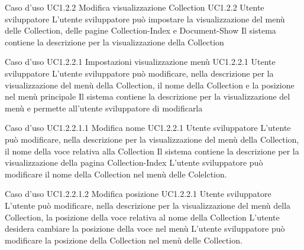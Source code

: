 \UCtitle
{Caso d'uso UC1.2.2}
{Modifica visualizzazione Collection}
\UC
{UC1.2.2}
{Utente sviluppatore}
{L'utente sviluppatore  può impostare la visualizzazione del menù delle Collection, delle pagine Collection-Index e Document-Show}
{Il sistema contiene la descrizione per la visualizzazione della Collection}

\UCtitle
{Caso d'uso UC1.2.2.1}
{Impostazioni visualizzazione menù}
\UC
{UC1.2.2.1}
{Utente sviluppatore}
{L'utente sviluppatore può modificare, nella descrizione per la visualizzazione del menù della Collection, il nome della Collection e la posizione nel menù principale}
{Il sistema contiene la descrizione per la visualizzazione del menù e permette all'utente sviluppatore di modificarla}

\UCtitle
{Caso d'uso UC1.2.2.1.1}
{Modifica nome}
\UC
{UC1.2.2.1}
{Utente sviluppatore}
{L'utente può modificare, nella descrizione per la visualizzazione del menù della Collection, il nome della voce relativa alla Collection}
{Il sistema contiene la descrizione per la visualizzazione della pagina Collection-Index}
\scenario
{L'utente sviluppatore può modificare il nome della Collection nel menù delle Colelction.}

\UCtitle
{Caso d'uso UC1.2.2.1.2}
{Modifica posizione}
\UC
{UC1.2.2.1}
{Utente sviluppatore}
{L'utente può modificare, nella descrizione per la visualizzazione del menù della Collection, la posizione della voce relativa al nome della Collection}
{L'utente desidera cambiare la posizione della voce nel menù}
\scenario
{L'utente sviluppatore può modificare la posizione della Collection nel menù delle Collection.}

